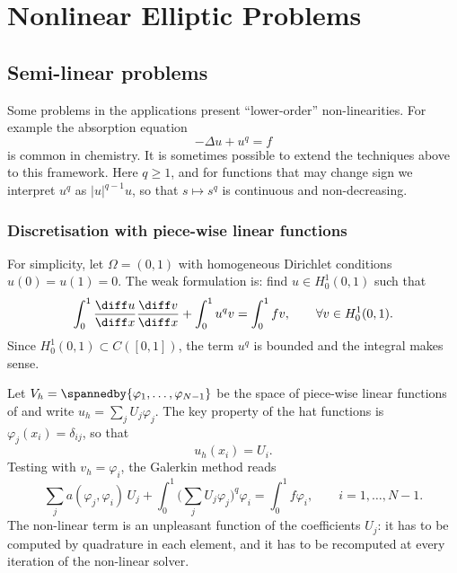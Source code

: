 \section{Nonlinear Elliptic Problems}

\subsection{Semi-linear problems}

Some problems in the applications present ``lower-order'' non-linearities. For example the absorption equation
\begin{equation*}
    -\Delta u + u^q = f
\end{equation*}
is common in chemistry. It is sometimes possible to extend the techniques above to this framework.
Here $q \ge 1$, and for functions that may change sign we interpret $u^q$ as $|u|^{q-1}u$, so that $s \mapsto s^q$ is continuous and non-decreasing.

\subsubsection{Discretisation with piece-wise linear functions}

For simplicity, let $\Omega = (0,1)$ with homogeneous Dirichlet conditions $u(0) = u(1) = 0$. The weak formulation is: find $u \in H^1_0(0,1)$ such that
\begin{equation*}
    \int_0^1 \frac{\diff u}{\diff x} \frac{\diff v}{\diff x} + \int_0^1 u^q v = \int_0^1 f v, \qquad \forall v \in H^1_0(0,1).
\end{equation*}
Since $H^1_0(0,1) \subset C([0,1])$, the term $u^q$ is bounded and the integral makes sense.

Let $V_h = \spannedby\{\varphi_1, \dots, \varphi_{N-1}\}$ be the space of piece-wise linear functions of  and write $u_h = \sum_{j} U_j \varphi_j$. The key property of the hat functions is $\varphi_j(x_i) = \delta_{ij}$, so that
\begin{equation*}
    u_h(x_i) = U_i .
\end{equation*}
Testing with $v_h = \varphi_i$, the Galerkin method reads
\begin{equation*}
    \sum_{j} a(\varphi_j, \varphi_i)\, U_j + \int_0^1 \Big( \sum_j U_j \varphi_j \Big)^q \varphi_i = \int_0^1 f \varphi_i, \qquad i = 1, \dots, N-1.
\end{equation*}
The non-linear term is an unpleasant function of the coefficients $U_j$: it has to be computed by quadrature in each element, and it has to be recomputed at every iteration of the non-linear solver.

